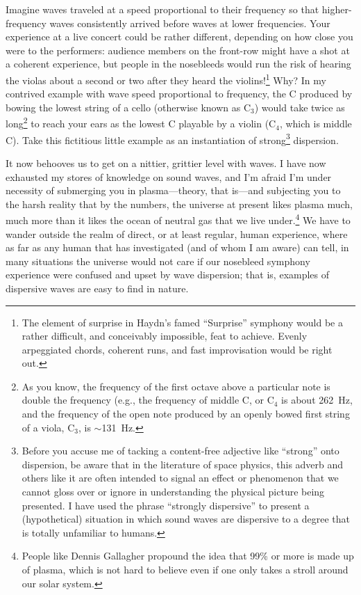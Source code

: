 Imagine waves traveled at a speed proportional to their frequency so that
higher-frequency waves consistently arrived before waves at lower
frequencies. Your experience at a live concert could be rather different,
depending on how close you were to the performers: audience members on the
front-row might have a shot at a coherent experience, but people in the
nosebleeds would run the risk of hearing the violas about a second or two after
they heard the violins!\footnote{The element of surprise in Haydn's famed
  ``Surprise'' symphony would be a rather difficult, and conceivably impossible,
  feat to achieve. Evenly arpeggiated chords, coherent runs, and
  fast improvisation would be right out.} Why? In my contrived example with wave
speed proportional to frequency, the C produced by bowing the lowest string of a
cello (otherwise known as $\textrm{C}_3$) would take twice as long\footnote{As
  you know, the frequency of the first octave above a particular note is double
  the frequency (e.g., the frequency of middle C, or $\textrm{C}_4$ is about
  262~Hz, and the frequency of the open note produced by an openly bowed first
  string of a viola, $\textrm{C}_3$, is $\sim$131~Hz.} to reach your ears as the
lowest C playable by a violin ($\textrm{C}_4$, which is middle C). Take this
fictitious little example as an instantiation of strong\footnote{Before you
  accuse me of tacking a content-free adjective like ``strong'' onto dispersion,
  be aware that in the literature of space physics, this adverb and others like
  it are often intended to signal an effect or phenomenon that we cannot gloss
  over or ignore in understanding the physical picture being presented. I have
  used the phrase ``strongly dispersive'' to present a (hypothetical) situation
  in which sound waves are dispersive to a degree that is totally unfamiliar to
  humans.}  dispersion.

It now behooves us to get on a nittier, grittier level with \Alf waves. I have
now exhausted my stores of knowledge on sound waves, and I'm afraid I'm under
necessity of submerging you in plasma---theory, that is---and subjecting you to
the harsh reality that by the numbers, the universe at present likes plasma
much, much more than it likes the ocean of neutral gas that we live
under.\footnote{People like Dennis Gallagher propound the idea that 99\% or more
  is made up of plasma, which is not hard to believe even if one only takes a
  stroll around our solar system.} We have to wander outside the realm of
direct, or at least regular, human experience, where as far as any human that
has investigated (and of whom I am aware) can tell, in many situations the
universe would not care if our nosebleed symphony experience were confused and
upset by wave dispersion; that is, examples of dispersive waves are easy to find
in nature. 

